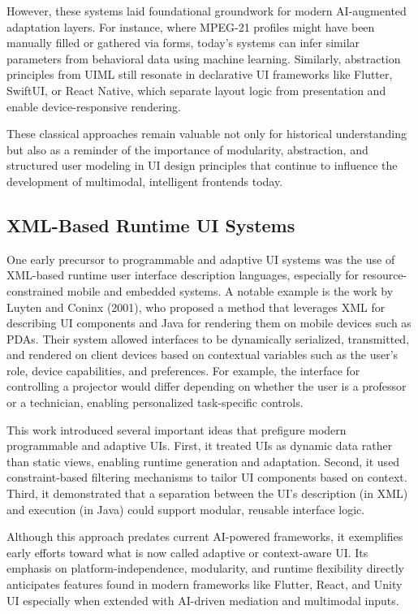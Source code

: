\documentclass[openany]{book}
\begin{document}
However, these systems laid foundational groundwork for modern AI-augmented adaptation layers. For instance, where MPEG-21 profiles might have been manually filled or gathered via forms, today’s systems can infer similar parameters from behavioral data using machine learning. Similarly, abstraction principles from UIML still resonate in declarative UI frameworks like Flutter, SwiftUI, or React Native, which separate layout logic from presentation and enable device-responsive rendering.

These classical approaches remain valuable not only for historical understanding but also as a reminder of the importance of modularity, abstraction, and structured user modeling in UI design principles that continue to influence the development of multimodal, intelligent frontends today.

\subsection{XML-Based Runtime UI Systems}

One early precursor to programmable and adaptive UI systems was the use of XML-based runtime user interface description languages, especially for resource-constrained mobile and embedded systems. A notable example is the work by Luyten and Coninx (2001), who proposed a method that leverages XML for describing UI components and Java for rendering them on mobile devices such as PDAs. Their system allowed interfaces to be dynamically serialized, transmitted, and rendered on client devices based on contextual variables such as the user's role, device capabilities, and preferences. For example, the interface for controlling a projector would differ depending on whether the user is a professor or a technician, enabling personalized task-specific controls.

This work introduced several important ideas that prefigure modern programmable and adaptive UIs. First, it treated UIs as dynamic data rather than static views, enabling runtime generation and adaptation. Second, it used constraint-based filtering mechanisms to tailor UI components based on context. Third, it demonstrated that a separation between the UI's description (in XML) and execution (in Java) could support modular, reusable interface logic.

Although this approach predates current AI-powered frameworks, it exemplifies early efforts toward what is now called adaptive or context-aware UI. Its emphasis on platform-independence, modularity, and runtime flexibility directly anticipates features found in modern frameworks like Flutter, React, and Unity UI especially when extended with AI-driven mediation and multimodal inputs.
\end{document}
